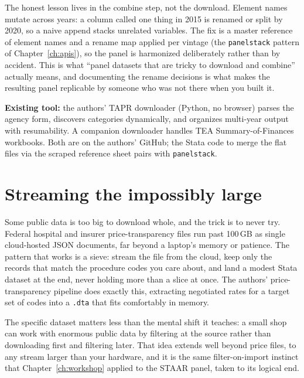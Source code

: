 \documentclass[
    a4paper,
    fontsize=10pt,
    twoside=true,
    numbers=noenddot,
]{kaobook}
\begin{document}
The honest lesson lives in the combine step, not the download. Element names mutate across years: a column called one thing in 2015 is renamed or split by 2020, so a naive append stacks unrelated variables. The fix is a master reference of element names and a rename map applied per vintage (the \texttt{panelstack} pattern of Chapter~\ref{ch:apis}), so the panel is harmonized deliberately rather than by accident. This is what \enquote{panel datasets that are tricky to download and combine} actually means, and documenting the rename decisions is what makes the resulting panel replicable by someone who was not there when you built it.

\begin{kaobox}[frametitle=Package Integration: \texttt{TEA-TAPR-download}]
\textbf{Existing tool:} the authors' TAPR downloader (Python, no browser) parses the agency form, discovers categories dynamically, and organizes multi-year output with resumability. A companion downloader handles TEA Summary-of-Finances workbooks. Both are on the authors' GitHub; the Stata code to merge the flat files via the scraped reference sheet pairs with \texttt{panelstack}.
\end{kaobox}

\section{Streaming the impossibly large}
Some public data is too big to download whole, and the trick is to never try. Federal hospital and insurer price-transparency files run past 100\,GB as single cloud-hosted JSON documents, far beyond a laptop's memory or patience. The pattern that works is a sieve: stream the file from the cloud, keep only the records that match the procedure codes you care about, and land a modest Stata dataset at the end, never holding more than a slice at once. The authors' price-transparency pipeline does exactly this, extracting negotiated rates for a target set of codes into a \texttt{.dta} that fits comfortably in memory.

The specific dataset matters less than the mental shift it teaches: a small shop can work with enormous public data by filtering at the source rather than downloading first and filtering later. That idea extends well beyond price files, to any stream larger than your hardware, and it is the same filter-on-import instinct that Chapter~\ref{ch:workshop} applied to the STAAR panel, taken to its logical end.
\end{document}
